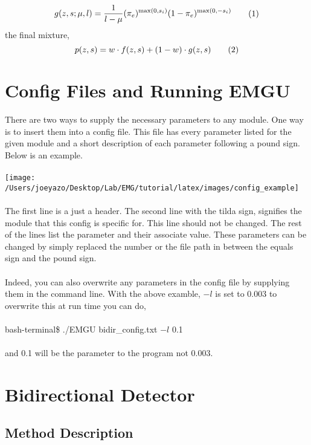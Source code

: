 \documentclass{article}
\newcommand\numberthis{\addtocounter{equation}{1}\tag{\theequation}}
\theoremstyle{definition}
\begin{document}
\begin{displaymath}
\begin{split}
    g(z, s; \mu, l)&=  
      	 \frac{1}{l-\mu}(\pi_e)^{\max(0, s_i)}(1-\pi_e)^{\max(0,-s_i)}   \\
\end{split} \numberthis \label{eqn_2}
\end{displaymath}
the final mixture,
\begin{displaymath}
p(z, s) 	= w\cdot f(z,s) + (1-w)\cdot g(z,s)  \numberthis \label{eqn_3}
\end{displaymath}

\section{Config Files and Running EMGU }
There are two ways to supply the necessary parameters to any module. One way is to insert them into a config file. This file has every parameter listed for the given module and a short description of each parameter following a pound sign. Below is an example.
\\
\\
\texttt{[image: /Users/joeyazo/Desktop/Lab/EMG/tutorial/latex/images/config\_example]}
\\
\\
The first line is a just a header. The second line with the tilda sign, signifies the module that this config is specific for. This line should not be changed. The rest of the lines list the parameter and their associate value. These parameters can be changed by simply replaced the number or the file path in between the equals sign and the pound sign. 
\\
\\
Indeed, you can also overwrite any parameters in the config file by supplying them in the command line. With the above examble, $-l$ is set to 0.003 to overwrite this at run time you can do, 
\\
\\
bash-terminal\$ ./EMGU bidir\_config.txt $-l$ 0.1
\\
\\
and 0.1 will be the parameter to the program not 0.003.

\section{Bidirectional Detector }
\subsection{Method Description}
\end{document}
